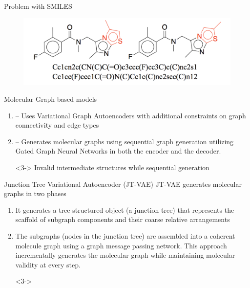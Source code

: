 \documentclass[9pt]{beamer}
\begin{document}
\begin{frame}{Problem with SMILES}
	\begin{figure}[htpb]
		\centering
		\includegraphics[width=\textwidth]{includes/smiles-problem.png}
	\end{figure}
\end{frame}

\begin{frame}{Molecular Graph based models}
	\begin{enumerate}
		\item <1->  -- Uses Variational Graph Autoencoders with additional constraints on graph connectivity and edge types
		\item <2->  -- Generates molecular graphs using sequential graph generation utilizing Gated Graph Neural Networks in both the encoder and the decoder.
			\vspace{1cm}
		\item[] <3->  Invalid intermediate structures while sequential generation
	\end{enumerate}
\end{frame}

\begin{frame}{Junction Tree Variational Autoencoder (JT-VAE)}
	JT-VAE generates molecular graphs in two phases
	\begin{enumerate}
		\item <1-> It generates a tree-structured object (a junction tree) that  represents  the  scaffold  of subgraph  components and  their  coarse  relative  arrangements
		\item <2-> The subgraphs (nodes in the junction tree) are assembled into a coherent molecule graph using a graph message passing network. This approach incrementally generates the molecular graph while maintaining molecular validity at every step.
		\item[] <3-> 
	\end{enumerate}
\end{frame}
\end{document}
